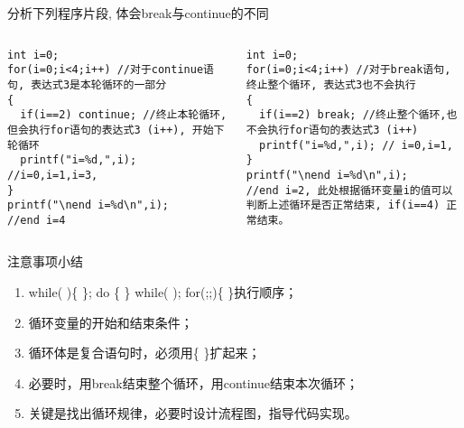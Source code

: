 \begin{frame}[fragile]{分析下列程序片段, 体会break与continue的不同}
\vspace{-0.5cm}
\begin{columns}
\begin{lstlisting}
int i=0;
for(i=0;i<4;i++) //对于continue语句, 表达式3是本轮循环的一部分 
{
  if(i==2) continue; //终止本轮循环,但会执行for语句的表达式3 (i++), 开始下轮循环 
  printf("i=%d,",i); //i=0,i=1,i=3,
}
printf("\nend i=%d\n",i);
//end i=4
\end{lstlisting} 
\begin{lstlisting}[frame=leftline]
int i=0;
for(i=0;i<4;i++) //对于break语句, 终止整个循环, 表达式3也不会执行 
{
  if(i==2) break; //终止整个循环,也不会执行for语句的表达式3 (i++)
  printf("i=%d,",i); // i=0,i=1, 
}
printf("\nend i=%d\n",i);
//end i=2, 此处根据循环变量i的值可以判断上述循环是否正常结束, if(i==4) 正常结束。 
\end{lstlisting} 
\end{columns}
\end{frame}

\begin{frame}{注意事项小结}
\begin{enumerate}
	\setlength{\itemsep}{.5cm}
	\item while( )\{ \}; do \{ \} while( ); for(;;)\{ \}执行顺序；
	\item 循环变量的开始和结束条件；
	\item 循环体是复合语句时，必须用\{ \}扩起来；
	\item 必要时，用break结束整个循环，用continue结束本次循环；
	\item 关键是找出循环规律，必要时设计流程图，指导代码实现。	
\end{enumerate}
\end{frame}